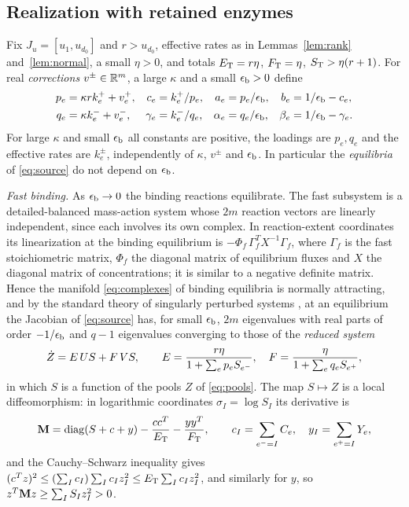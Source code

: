 \subsection{Realization with retained enzymes}
Fix \(J_u=[u_1,u_{d_0}]\) and \(r>u_{d_0}\), effective rates as in Lemmas~\ref{lem:rank}
and~\ref{lem:normal}, a small \(\eta>0\), and totals \(E_{\mathrm T}=r\eta\), \(F_{\mathrm T}=\eta\),
\(S_{\mathrm T}>\eta(r+1)\). For real \emph{corrections} \(v^\pm\in\mathbb R^m\), a large \(\kappa\) and a small
\(\epsilon_{\mathrm b}>0\) define
\begin{equation}\label{eq:loading}
\begin{aligned}
 p_e&=\kappa rk_e^++v_e^+,& c_e&=k_e^+/p_e,& a_e&=p_e/\epsilon_{\mathrm b},& b_e&=1/\epsilon_{\mathrm b}-c_e,\\
 q_e&=\kappa k_e^-+v_e^-,& \gamma_e&=k_e^-/q_e,& \alpha_e&=q_e/\epsilon_{\mathrm b},& \beta_e&=1/\epsilon_{\mathrm b}-\gamma_e .
\end{aligned}
\end{equation}
For large \(\kappa\) and small \(\epsilon_{\mathrm b}\) all constants are positive, the loadings are
\(p_e,q_e\) and the effective rates are \(k_e^\pm\), independently of \(\kappa\), \(v^\pm\) and
\(\epsilon_{\mathrm b}\). In particular the \emph{equilibria} of \eqref{eq:source} do not depend on \(\epsilon_{\mathrm b}\).

\emph{Fast binding.} As \(\epsilon_{\mathrm b}\to0\) the binding reactions equilibrate. The fast subsystem is a
detailed-balanced mass-action system whose \(2m\) reaction vectors are linearly independent,
since each involves its own complex. In reaction-extent coordinates its linearization at the
binding equilibrium is \(-\Phi_{\!f}\,\Gamma_{\!f}^TX^{-1}\Gamma_{\!f}\), where
\(\Gamma_{\!f}\) is the fast stoichiometric matrix, \(\Phi_{\!f}\) the diagonal matrix of
equilibrium fluxes and \(X\) the diagonal matrix of concentrations; it is similar to a negative
definite matrix. Hence the manifold \eqref{eq:complexes} of binding equilibria is normally
attracting, and by the standard theory of singularly perturbed systems
\cite{Fenichel1979,KKO}, at an equilibrium the Jacobian of \eqref{eq:source} has, for small
\(\epsilon_{\mathrm b}\), \(2m\) eigenvalues with real parts of order \(-1/\epsilon_{\mathrm b}\) and \(q-1\) eigenvalues
converging to those of the \emph{reduced system}
\begin{equation}\label{eq:reduced}
 \dot Z=E\,US+F\,VS,\qquad
 E=\frac{r\eta}{1+\sum_ep_eS_{e^{-}}},\quad F=\frac{\eta}{1+\sum_eq_eS_{e^{+}}},
\end{equation}
in which \(S\) is a function of the pools \(Z\) of \eqref{eq:pools}. The map \(S\mapsto Z\) is
a local diffeomorphism: in logarithmic coordinates \(\sigma_I=\log S_I\) its derivative is
\begin{equation}\label{eq:mass}
 \mathbf M=\operatorname{diag}(S+c+y)-\frac{cc^T}{E_{\mathrm T}}-\frac{yy^T}{F_{\mathrm T}},\qquad
 c_I=\sum_{e^{-}=I}C_e,\quad y_I=\sum_{e^{+}=I}Y_e ,
\end{equation}
and the Cauchy--Schwarz inequality gives
\((c^Tz)^2\le(\sum_Ic_I)\sum_Ic_Iz_I^2\le E_{\mathrm T}\sum_Ic_Iz_I^2\), and similarly for \(y\), so
\(z^T\mathbf M z\ge\sum_IS_Iz_I^2>0\).

